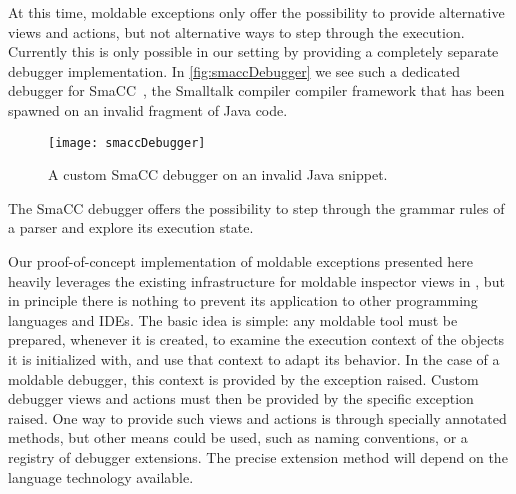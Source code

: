 \documentclass[sigplan,screen]{acmart} %
\newcommand\on[1]{\nbc{ON}{#1}{olive}} %
\newcommand\ac[1]{\nbc{AC}{#1}{teal}}
\newcommand{\GT}{\lst{GT}\xspace} %
\begin{document}
At this time, moldable exceptions only offer the possibility to provide alternative views and actions, but not alternative ways to step through the execution.
Currently this is only possible in our setting by providing a completely separate debugger implementation.
In \autoref{fig:smaccDebugger} we see such a dedicated debugger for SmaCC~\cite{Brant17a}, the Smalltalk compiler compiler framework that has been spawned on an invalid fragment of Java code.
\begin{figure}[h]
  \texttt{[image: smaccDebugger]}
  \caption{A custom SmaCC debugger on an invalid Java snippet.}
  \label{fig:smaccDebugger}
\end{figure}
The SmaCC debugger offers the possibility to step through the grammar rules of a parser and explore its execution state.


Our proof-of-concept implementation of moldable exceptions presented here heavily leverages the existing infrastructure for moldable inspector views in \GT, but in principle there is nothing to prevent its application to other programming languages and IDEs.
The basic idea is simple: any moldable tool must be prepared, whenever it is created, to examine the execution context of the objects it is initialized with, and use that context to adapt its behavior.
In the case of a moldable debugger, this context is provided by the exception raised.
Custom debugger views and actions must then be provided by the specific exception raised.
One way to provide such views and actions is through specially annotated methods, but other means could be used, such as naming conventions, or a registry of debugger extensions.
The precise extension method will depend on the language technology available.

\end{document}
